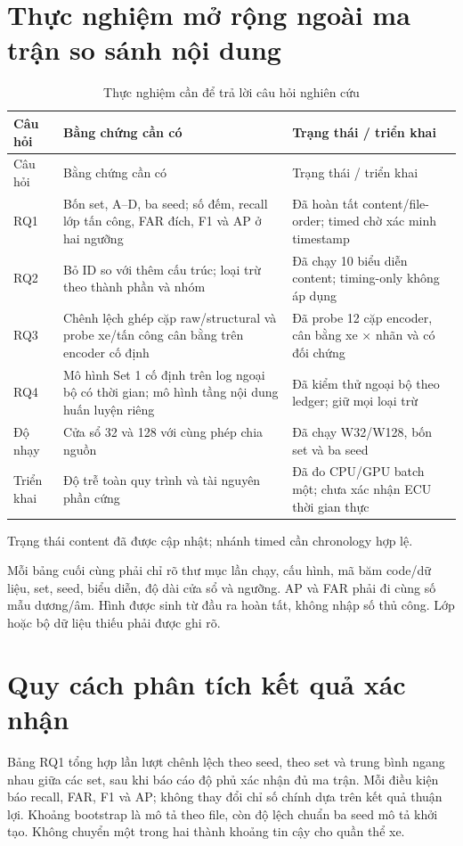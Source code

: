 \documentclass[12pt,a4paper,oneside,openany]{extbook}
\begin{document}
\section{Thực nghiệm mở rộng ngoài ma trận so sánh nội dung}
\begin{longtable}{P{2.4cm}P{5.3cm}P{5.2cm}}
\caption{Thực nghiệm cần để trả lời câu hỏi nghiên cứu}\label{tab:pending}\\\toprule
Câu hỏi & Bằng chứng cần có & Trạng thái / triển khai\\\midrule\endfirsthead
\toprule Câu hỏi & Bằng chứng cần có & Trạng thái / triển khai\\\midrule\endhead
RQ1 & Bốn set, A--D, ba seed; số đếm, recall lớp tấn công, FAR đích, F1 và AP ở hai ngưỡng & Đã hoàn tất content/file-order; timed chờ xác minh timestamp\\
RQ2 & Bỏ ID so với thêm cấu trúc; loại trừ theo thành phần và nhóm & Đã chạy 10 biểu diễn content; timing-only không áp dụng\\
RQ3 & Chênh lệch ghép cặp raw/structural và probe xe/tấn công cân bằng trên encoder cố định & Đã probe 12 cặp encoder, cân bằng xe × nhãn và có đối chứng\\
RQ4 & Mô hình Set 1 cố định trên log ngoại bộ có thời gian; mô hình tầng nội dung huấn luyện riêng & Đã kiểm thử ngoại bộ theo ledger; giữ mọi loại trừ\\
Độ nhạy & Cửa sổ 32 và 128 với cùng phép chia nguồn & Đã chạy W32/W128, bốn set và ba seed\\
Triển khai & Độ trễ toàn quy trình và tài nguyên phần cứng & Đã đo CPU/GPU batch một; chưa xác nhận ECU thời gian thực\\\bottomrule
\end{longtable}
Trạng thái content đã được cập nhật; nhánh timed cần chronology hợp lệ.

Mỗi bảng cuối cùng phải chỉ rõ thư mục lần chạy, cấu hình, mã băm code/dữ liệu, set, seed, biểu diễn, độ dài cửa sổ và ngưỡng. AP và FAR phải đi cùng số mẫu dương/âm. Hình được sinh từ đầu ra hoàn tất, không nhập số thủ công. Lớp hoặc bộ dữ liệu thiếu phải được ghi rõ.

\section{Quy cách phân tích kết quả xác nhận}
Bảng RQ1 tổng hợp lần lượt chênh lệch theo seed, theo set và trung bình ngang nhau giữa các set, sau khi báo cáo độ phủ xác nhận đủ ma trận. Mỗi điều kiện báo recall, FAR, F1 và AP; không thay đổi chỉ số chính dựa trên kết quả thuận lợi. Khoảng bootstrap là mô tả theo file, còn độ lệch chuẩn ba seed mô tả khởi tạo. Không chuyển một trong hai thành khoảng tin cậy cho quần thể xe.
\end{document}
